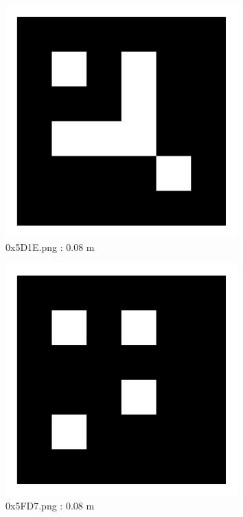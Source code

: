 \documentclass[11pt,a4,BCOR=0cm]{scrartcl}
\begin{document}
\begin{figure}
  \centering
    \includegraphics[width=8.955cm]{0x5D1E.pdf}
    \caption{0x5D1E.png : 0.08 m}
    \label{fig:0x5D1E.pdf}
  
\end{figure} 

\begin{figure}
  \centering
    \includegraphics[width=8.955cm]{0x5FD7.pdf}
    \caption{0x5FD7.png : 0.08 m}
    \label{fig:0x5FD7.pdf}
  
\end{figure} 
\end{document}
